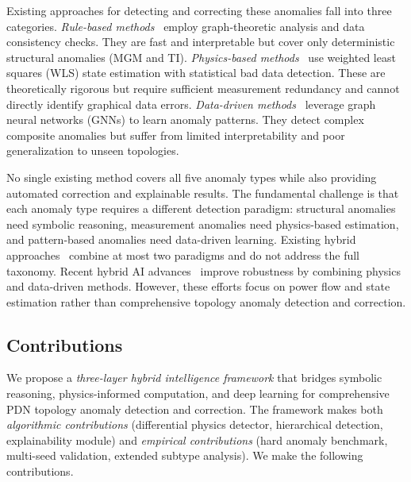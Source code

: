 \documentclass[research]{fcs}
\begin{document}
Existing approaches for detecting and correcting these anomalies fall into three categories. \emph{Rule-based methods}~\cite{abur2004power} employ graph-theoretic analysis and data consistency checks. They are fast and interpretable but cover only deterministic structural anomalies (MGM and TI). \emph{Physics-based methods}~\cite{wls1970state,lav1991state,chi2_test_se,normalized_residual} use weighted least squares (WLS) state estimation with statistical bad data detection. These are theoretically rigorous but require sufficient measurement redundancy and cannot directly identify graphical data errors. \emph{Data-driven methods}~\cite{hamilton2017inductive,kipf2017semi,wu2021comprehensive,physics_informed_gnn_se2023,gnn_bddi_se2026} leverage graph neural networks (GNNs) to learn anomaly patterns. They detect complex composite anomalies but suffer from limited interpretability and poor generalization to unseen topologies.

No single existing method covers all five anomaly types while also providing automated correction and explainable results. The fundamental challenge is that each anomaly type requires a different detection paradigm: structural anomalies need symbolic reasoning, measurement anomalies need physics-based estimation, and pattern-based anomalies need data-driven learning. Existing hybrid approaches~\cite{egat2025,hybrid_gnn_lse2025,meta_pigat_dsse2025} combine at most two paradigms and do not address the full taxonomy. Recent hybrid AI advances~\cite{meta_pigat_dsse2025,kclnet2026,gao_pg_gcn_opf2024} improve robustness by combining physics and data-driven methods. However, these efforts focus on power flow and state estimation rather than comprehensive topology anomaly detection and correction.

\subsection{Contributions}

We propose a \emph{three-layer hybrid intelligence framework} that bridges symbolic reasoning, physics-informed computation, and deep learning for comprehensive PDN topology anomaly detection and correction. The framework makes both \emph{algorithmic contributions} (differential physics detector, hierarchical detection, explainability module) and \emph{empirical contributions} (hard anomaly benchmark, multi-seed validation, extended subtype analysis). We make the following contributions.
\end{document}
